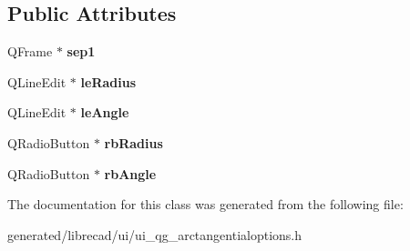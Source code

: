 \subsection*{Public Attributes}
\begin{DoxyCompactItemize}
\item 
\hypertarget{classUi__QG__ArcTangentialOptions_a91cc84d5677dd6d2b8cef473c6841cd4}{Q\-Frame $\ast$ {\bfseries sep1}}\label{classUi__QG__ArcTangentialOptions_a91cc84d5677dd6d2b8cef473c6841cd4}

\item 
\hypertarget{classUi__QG__ArcTangentialOptions_a045fb0ebc37c1d89415b0221610d2bd0}{Q\-Line\-Edit $\ast$ {\bfseries le\-Radius}}\label{classUi__QG__ArcTangentialOptions_a045fb0ebc37c1d89415b0221610d2bd0}

\item 
\hypertarget{classUi__QG__ArcTangentialOptions_a5be32757b4a11516f0a2a60bc144e7a0}{Q\-Line\-Edit $\ast$ {\bfseries le\-Angle}}\label{classUi__QG__ArcTangentialOptions_a5be32757b4a11516f0a2a60bc144e7a0}

\item 
\hypertarget{classUi__QG__ArcTangentialOptions_a4efc7bc91ba38eea784f31b152610b4a}{Q\-Radio\-Button $\ast$ {\bfseries rb\-Radius}}\label{classUi__QG__ArcTangentialOptions_a4efc7bc91ba38eea784f31b152610b4a}

\item 
\hypertarget{classUi__QG__ArcTangentialOptions_abf1e0245b0d66065e933d03fedecd189}{Q\-Radio\-Button $\ast$ {\bfseries rb\-Angle}}\label{classUi__QG__ArcTangentialOptions_abf1e0245b0d66065e933d03fedecd189}

\end{DoxyCompactItemize}


The documentation for this class was generated from the following file\-:\begin{DoxyCompactItemize}
\item 
generated/librecad/ui/ui\-\_\-qg\-\_\-arctangentialoptions.\-h\end{DoxyCompactItemize}
